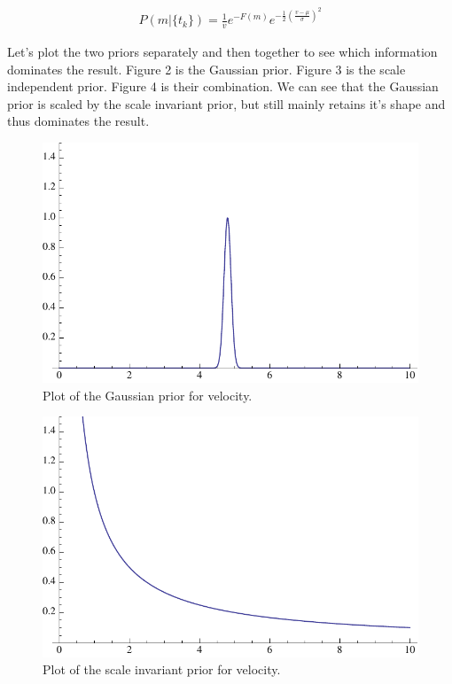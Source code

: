 \documentclass[11pt]{article}
\begin{document}
\begin{eqnarray*}
P(m|\{t_k\}) =  \frac{1}{v} e^{-F(m)} e^{-\frac{1}{2}(\frac{v-\mu}{\sigma})^2}
\end{eqnarray*}

Let's plot the two priors separately and then together to see which information dominates the result.  Figure 2 is the Gaussian prior.  Figure 3 is the scale independent prior.  Figure 4 is their combination.  We can see that the Gaussian prior is scaled by the scale invariant prior, but still mainly retains it's shape and thus dominates the result.

\begin{figure}
\begin{center}
  \includegraphics[width=12cm]{ESE118_PS4_P3_Fig1.pdf}
  \caption{Plot of the Gaussian prior for velocity.}
  \end{center}
\end{figure}

\begin{figure}
\begin{center}
  \includegraphics[width=12cm]{ESE118_PS4_P3_Fig2.pdf}
  \caption{Plot of the scale invariant prior for velocity.}
  \end{center}
\end{figure}
\end{document}
